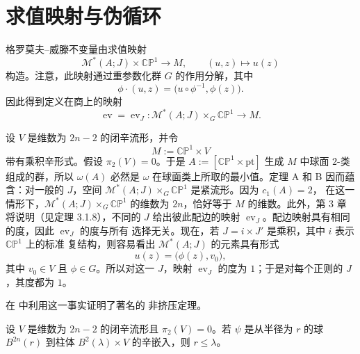 
\section{求值映射与伪循环}\label{sec:1-3}

格罗莫夫--威滕不变量由求值映射
\[
  \mathcal M^*(A;J)\times\mathbb{CP}^1\longrightarrow M,
  \qquad (u,z)\longmapsto u(z)
\]
构造。注意，此映射通过重参数化群 $G$ 的作用分解，其中
\[
  \phi\cdot(u,z)=\bigl(u\circ\phi^{-1},\phi(z)\bigr).
\]
因此得到定义在商上的映射
\[
  \operatorname{ev}=\operatorname{ev}_J:
  \mathcal M^*(A;J)\times_G\mathbb{CP}^1\longrightarrow M.
\]

\begin{namedexample}
设 $V$ 是维数为 $2n-2$ 的闭辛流形，并令
\[
  M:=\mathbb{CP}^1\times V
\]
带有乘积辛形式。假设 $\pi_2(V)=0$。于是
$A:=[\mathbb{CP}^1\times\mathrm{pt}]$ 生成 $M$ 中球面 $2$-类组成的群，所以
$\omega(A)$ 必然是 $\omega$ 在球面类上所取的最小值。定理 A 和 B 因而蕴含：对一般的
$J$，空间 $\mathcal M^*(A;J)\times_G\mathbb{CP}^1$ 是紧流形。因为 $c_1(A)=2$，
在这一情形下，$\mathcal M^*(A;J)\times_G\mathbb{CP}^1$ 的维数为 $2n$，恰好等于
$M$ 的维数。此外，第 3 章将说明（见定理 3.1.8），不同的 $J$ 给出彼此配边的映射
$\operatorname{ev}_J$。配边映射具有相同的度，因此 $\operatorname{ev}_J$ 的度与所有
选择无关。现在，若 $J=i\times J'$ 是乘积，其中 $i$ 表示 $\mathbb{CP}^1$ 上的标准
复结构，则容易看出 $\mathcal M^*(A;J)$ 的元素具有形式
\[
  u(z)=\bigl(\phi(z),v_0\bigr),
\]
其中 $v_0\in V$ 且 $\phi\in G$。所以对这一 $J$，映射 $\operatorname{ev}_J$ 的度为
$1$；于是对每个正则的 $J$，其度都为 $1$。
\end{namedexample}

在  中利用这一事实证明了著名的
非挤压定理。

\begin{namedtheorem}
设 $V$ 是维数为 $2n-2$ 的闭辛流形且 $\pi_2(V)=0$。若 $\psi$ 是从半径为 $r$ 的球
$B^{2n}(r)$ 到柱体 $B^2(\lambda)\times V$ 的辛嵌入，则 $r\le\lambda$。
\end{namedtheorem}


